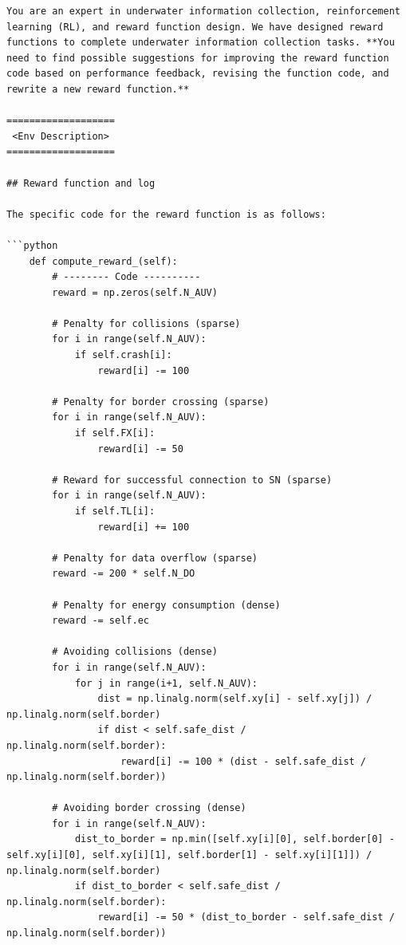 \documentclass{article}
\begin{document}
\begin{verbatim}
You are an expert in underwater information collection, reinforcement learning (RL), and reward function design. We have designed reward functions to complete underwater information collection tasks. **You need to find possible suggestions for improving the reward function code based on performance feedback, revising the function code, and rewrite a new reward function.**

===================
 <Env Description>
===================

## Reward function and log

The specific code for the reward function is as follows:

```python
    def compute_reward_(self):
        # -------- Code ----------
        reward = np.zeros(self.N_AUV)
        
        # Penalty for collisions (sparse)
        for i in range(self.N_AUV):
            if self.crash[i]:
                reward[i] -= 100
        
        # Penalty for border crossing (sparse)
        for i in range(self.N_AUV):
            if self.FX[i]:
                reward[i] -= 50
        
        # Reward for successful connection to SN (sparse)
        for i in range(self.N_AUV):
            if self.TL[i]:
                reward[i] += 100
        
        # Penalty for data overflow (sparse)
        reward -= 200 * self.N_DO
        
        # Penalty for energy consumption (dense)
        reward -= self.ec
        
        # Avoiding collisions (dense)
        for i in range(self.N_AUV):
            for j in range(i+1, self.N_AUV):
                dist = np.linalg.norm(self.xy[i] - self.xy[j]) / np.linalg.norm(self.border)
                if dist < self.safe_dist / np.linalg.norm(self.border):
                    reward[i] -= 100 * (dist - self.safe_dist / np.linalg.norm(self.border))
        
        # Avoiding border crossing (dense)
        for i in range(self.N_AUV):
            dist_to_border = np.min([self.xy[i][0], self.border[0] - self.xy[i][0], self.xy[i][1], self.border[1] - self.xy[i][1]]) / np.linalg.norm(self.border)
            if dist_to_border < self.safe_dist / np.linalg.norm(self.border):
                reward[i] -= 50 * (dist_to_border - self.safe_dist / np.linalg.norm(self.border))
        

\end{verbatim}
\end{document}
